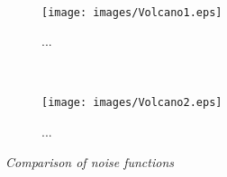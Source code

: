 \\
\begin{figure}[H]
\begin{subfigure}{\textwidth}
  \centering
  \texttt{[image: images/Volcano1.eps]}
  \caption{...}
  \label{fig:vulcano1}
\end{subfigure}%
\\
\begin{subfigure}{\textwidth}
  \centering
  \texttt{[image: images/Volcano2.eps]}
  \caption{...}
  \label{fig:vulcano2}
\end{subfigure}
\caption[Noise comparison]{\textit{Comparison of noise functions}}
\label{fig:vulcano3}
\end{figure}



